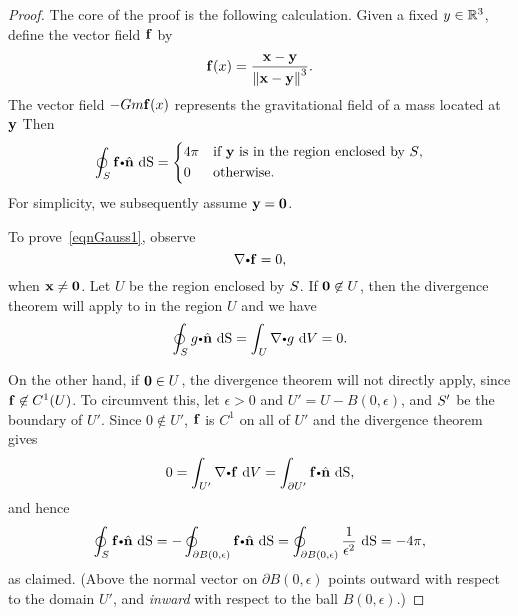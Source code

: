   \begin{proof}
    The core of the proof is the following calculation.
    Given a fixed $y \in \mathbb{R}^3$, define the vector field $\mathbf{ f}$ by
    \begin{equation*}
      \mathbf{ f}(x) = \dfrac{\mathbf{ x}-\mathbf{ y}}{{\left\|\mathbf{ x} - \mathbf{ y}\right\|}^3}.
    \end{equation*}
    The vector field $-Gm \mathbf{ f}(x)$ represents the gravitational field of a mass located at $\mathbf{ y}$
    Then
    \begin{equation}\label{eqnGauss1}
      \doint_\superficie  \funvect{f} \bp \hat{ \vector{n}} \,   \d \S=
      \begin{cases*}
	4\pi & if $\vector{y}$ is in the region enclosed by $\superficie$,\\
	0 & otherwise.
      \end{cases*}
    \end{equation}
    For simplicity, we subsequently assume $\mathbf{ y} = \mathbf{ 0}$.

    To prove~\eqref{eqnGauss1}, observe
    \begin{equation*}
      \grad \bp \funvect{f} = 0,
    \end{equation*}
    when $\mathbf{ x} \neq \mathbf{ 0}$.
    Let $U$ be the region enclosed by $S$.
    If $\mathbf{ 0} \not\in U$, then the divergence theorem will apply to in the region $U$ and we have
    \begin{equation*}
      \doint_\superficie g \bp \hat{ \vector{n}} \,   \d \S= \dint_U \grad \bp g \, \d V = 0.
    \end{equation*}

    On the other hand, if $\mathbf{ 0} \in U$, the divergence theorem will not directly apply, since $\mathbf{ f} \not \in C^1(U)$.
    To circumvent this, let $\epsilon > 0$ and $U' = U - B(0, \epsilon)$, and $S'$ be the boundary of $U'$.
    Since $0 \not \in U'$, $\mathbf{ f}$ is $C^1$ on all of $U'$ and the divergence theorem  gives
    \begin{equation*}
      0 = \dint_{U'} \grad \bp \funvect{f} \, \d V = \dint_{\partial U'} \funvect{f} \bp \hat{ \vector{n}} \,  \d \S,
    \end{equation*}
    and hence
    \begin{equation*}
      \doint_{\superficie} \funvect{f} \bp \hat{ \vector{n}} \,  \d \S
	= -\doint_{\partial B(0, \epsilon)} \funvect{f} \bp \hat{ \vector{n}} \,  \d \S
	= \doint_{\partial B(0, \epsilon)} \dfrac{1}{\epsilon^2} \,  \d \S
	= -4\pi,
    \end{equation*}
    as claimed.
    (Above the normal vector on $\partial B(0, \epsilon)$ points outward with respect to the domain $U'$, and \emph{inward} with respect to the ball $B(0, \epsilon)$.)


\end{proof}
